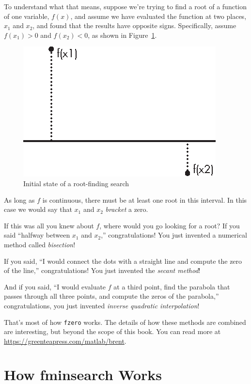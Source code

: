 To understand what that means, suppose we're trying to find a root of a function of one variable, $f(x)$, and assume we have evaluated the function at two places, $x_1$ and $x_2$, and found that the results have opposite signs.  Specifically, assume $f(x_1) > 0$ and $f(x_2) < 0$, as shown in Figure~\ref{fig:secant}.

\begin{figure}[ht]
\centerline{\includegraphics{book/images/figure15_03_new.eps}}
\caption{Initial state of a root-finding search}
\label{fig:secant}
\end{figure}

As long as $f$ is continuous, there must be at least one root in this interval.
In this case we would say that $x_1$ and $x_2$ \emph{bracket} a zero.


If this was all you knew about $f$, where would you go looking for
a root?  If you said ``halfway between $x_1$ and $x_2$,''
congratulations!  You just invented a numerical method called
\emph{bisection}!

If you said, ``I would connect the dots with a straight line
and compute the zero of the line,''
congratulations!  You just invented the \emph{secant method}!

And if you said, ``I would evaluate $f$ at a third point, find the
parabola that passes through all three points, and compute the zeros
of the parabola,'' congratulations, you just invented
\emph{inverse quadratic interpolation}!

That's most of how \lstinline{fzero} works.  The details of how these methods are combined are interesting, but beyond the scope of this book.  You can read more at \url{https://greenteapress.com/matlab/brent}.


\section{How fminsearch Works}
\label{howfminsearch}

